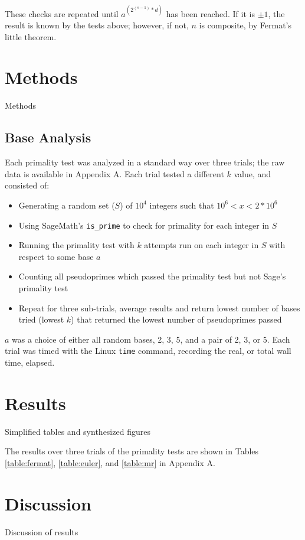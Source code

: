 \documentclass{article}
\begin{document}
These checks are repeated until $a^{(2^{(s - 1)} * d)}$ has been reached. If it is $\pm 1$, the result is known by the tests above; however, if not, $n$ is composite, by Fermat's little theorem.

\section{Methods}
Methods

\subsection{Base Analysis}
Each primality test was analyzed in a standard way over three trials; the raw data is available in Appendix A. Each trial tested a different $k$ value, and consisted of:
\begin{itemize}
    \item{Generating a random set ($S$) of $10^4$ integers such that $10^6 < x < 2*10^6$}
    \item{Using SageMath's \texttt{is\_prime} to check for primality for each integer in $S$}
    \item{Running the primality test with $k$ attempts run on each integer in $S$ with respect to some base $a$}
    \item{Counting all pseudoprimes which passed the primality test but not Sage's primality test}
    \item{Repeat for three sub-trials, average results and return lowest number of bases tried (lowest $k$) that returned the lowest number of pseudoprimes passed}
\end{itemize}
$a$ was a choice of either all random bases, 2, 3, 5, and a pair of 2, 3, or 5. Each trial was timed with the Linux \texttt{time} command, recording the real, or total wall time, elapsed. 

\section{Results}
Simplified tables and synthesized figures

The results over three trials of the primality tests are shown in Tables \ref{table:fermat}, \ref{table:euler}, and \ref{table:mr} in Appendix A.

\section{Discussion}
Discussion of results
\end{document}
